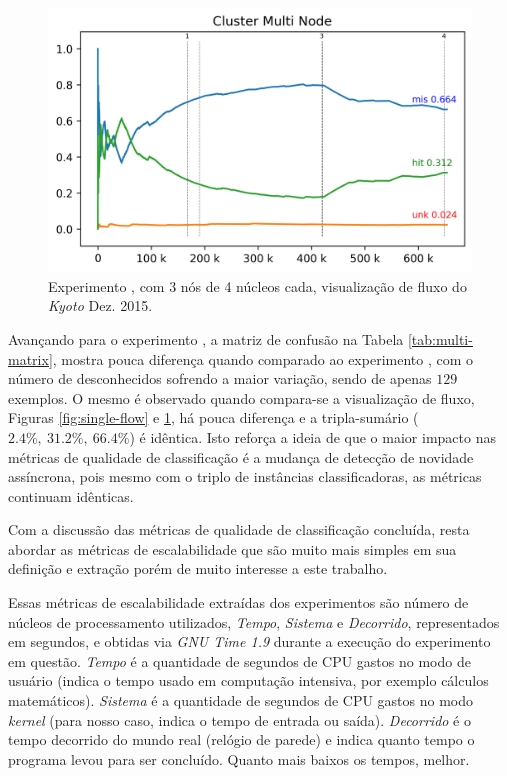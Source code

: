 \begin{figure}[htb]
  \centering
  \includegraphics[width=0.75\linewidth]{experiments/tmi-n12-log.png}
  \caption{Experimento \expD, \mfog com 3 nós de 4 núcleos cada, visualização de
  fluxo do \dataset \emph{Kyoto} Dez. 2015.}
  \label{fig:multi-flow}
\end{figure}

Avançando para o experimento \expD, a matriz de confusão na Tabela
\ref{tab:multi-matrix}, mostra pouca diferença quando comparado ao experimento
\expC, com o número de desconhecidos sofrendo a maior variação, sendo de apenas
$129$ exemplos.
O mesmo é observado quando compara-se a visualização de fluxo, Figuras
\ref{fig:single-flow} e \ref{fig:multi-flow}, há pouca diferença e a tripla-sumário
($2.4\%,\: 31.2\%,\: 66.4\%$) é idêntica.
Isto reforça a ideia de que o maior impacto nas métricas de qualidade de
classificação é a mudança de detecção de novidade assíncrona, pois mesmo com o
triplo de instâncias classificadoras, as métricas continuam idênticas.

Com a discussão das métricas de qualidade de classificação concluída, resta
abordar as métricas de escalabilidade que são muito mais simples em sua
definição e extração porém de muito interesse a este trabalho.

Essas métricas de escalabilidade extraídas dos experimentos são número de
núcleos de processamento utilizados, \emph{Tempo}, \emph{Sistema} e
\emph{Decorrido}, representados em segundos, e obtidas via \emph{GNU Time 1.9}
durante a execução do experimento em questão.
\emph{Tempo} é a quantidade de segundos de CPU gastos no modo de usuário
(indica o tempo usado em computação intensiva, por exemplo cálculos matemáticos).
\emph{Sistema} é a quantidade de segundos de CPU gastos no modo \emph{kernel} (para
nosso caso, indica o tempo de entrada ou saída).
\emph{Decorrido} é o tempo decorrido do mundo real (relógio de parede) e indica
quanto tempo o programa levou para ser concluído.
Quanto mais baixos os tempos, melhor.

